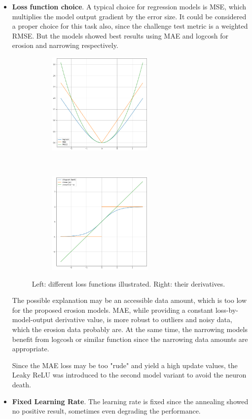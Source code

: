 \documentclass[thesis=B,english]{FITthesis}[2019/12/23]
\begin{document}
\begin{itemize}
	\item \textbf{Loss function choice}. A typical choice for regression models is MSE, which multiplies the model output gradient by the error size. It could be considered a proper choice for this task also, since the challenge test metric is a weighted RMSE. But the models showed best results using MAE and logcosh for erosion and narrowing respectively.
	
	\begin{figure}[h]
		\centering
		\begin{subfigure}[b]{.48\textwidth}
			\centering
			\includegraphics[height=5cm]{images/losses.png}
		\end{subfigure}
		~
		\begin{subfigure}[b]{.48\textwidth}
			\centering
			\includegraphics[height=5cm]{images/loss_derivatives.png}
		\end{subfigure}
		\caption{Left: different loss functions illustrated. Right: their derivatives.}
	\end{figure}
	
	The possible explanation may be an accessible data amount, which is too low for the proposed erosion models. MAE, while providing a constant loss-by-model-output derivative value, is more robust to outliers and noisy data, which the erosion data probably are. At the same time, the narrowing models benefit from logcosh or similar function since the narrowing data amounts are appropriate.
	
	Since the MAE loss may be too "rude" and yield a high update values, the Leaky ReLU was introduced to the second model variant to avoid the neuron death.
	\item \textbf{Fixed Learning Rate}. The learning rate is fixed since the annealing showed no positive result, sometimes even degrading the performance.
	

\end{itemize}
\end{document}
